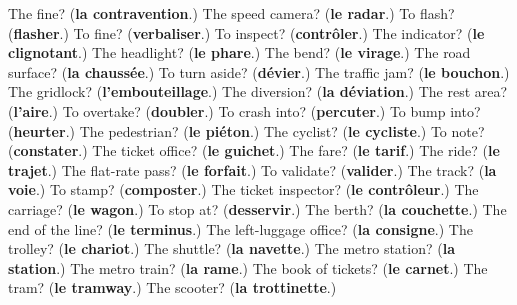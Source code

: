 \begin{tcolorbox}[breakable,colback=teal!4,colframe=teal!35!black,title={Before you move on}]
The fine? (\textbf{la contravention}.) The speed camera? (\textbf{le radar}.) To flash? (\textbf{flasher}.) To fine? (\textbf{verbaliser}.) To inspect? (\textbf{contrôler}.) The indicator? (\textbf{le clignotant}.) The headlight? (\textbf{le phare}.) The bend? (\textbf{le virage}.) The road surface? (\textbf{la chaussée}.) To turn aside? (\textbf{dévier}.) The traffic jam? (\textbf{le bouchon}.) The gridlock? (\textbf{l'embouteillage}.) The diversion? (\textbf{la déviation}.) The rest area? (\textbf{l'aire}.) To overtake? (\textbf{doubler}.) To crash into? (\textbf{percuter}.) To bump into? (\textbf{heurter}.) The pedestrian? (\textbf{le piéton}.) The cyclist? (\textbf{le cycliste}.) To note? (\textbf{constater}.) The ticket office? (\textbf{le guichet}.) The fare? (\textbf{le tarif}.) The ride? (\textbf{le trajet}.) The flat-rate pass? (\textbf{le forfait}.) To validate? (\textbf{valider}.) The track? (\textbf{la voie}.) To stamp? (\textbf{composter}.) The ticket inspector? (\textbf{le contrôleur}.) The carriage? (\textbf{le wagon}.) To stop at? (\textbf{desservir}.) The berth? (\textbf{la couchette}.) The end of the line? (\textbf{le terminus}.) The left-luggage office? (\textbf{la consigne}.) The trolley? (\textbf{le chariot}.) The shuttle? (\textbf{la navette}.) The metro station? (\textbf{la station}.) The metro train? (\textbf{la rame}.) The book of tickets? (\textbf{le carnet}.) The tram? (\textbf{le tramway}.) The scooter? (\textbf{la trottinette}.)
\end{tcolorbox}
